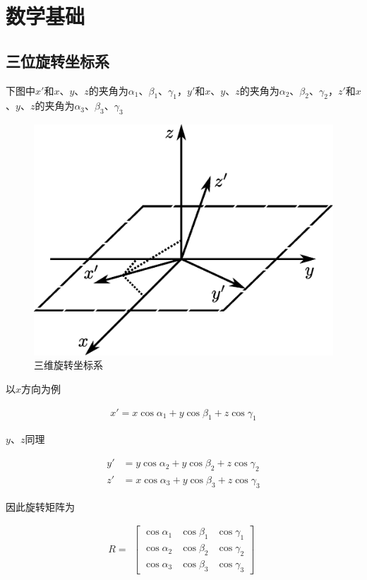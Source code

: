 \section{数学基础}

\subsection{三位旋转坐标系}

下图中$x'$和$x$、$y$、$z$的夹角为$\alpha_1$、$\beta_1$、$\gamma_1$，$y'$和$x$、$y$、$z$的夹角为$\alpha_2$、$\beta_2$、$\gamma_2$，$z'$和$x$、$y$、$z$的夹角为$\alpha_3$、$\beta_3$、$\gamma_3$

\begin{figure}[H]
  \centering
  \includegraphics[width=0.5\linewidth]{figures/三维旋转坐标系}
  \caption{三维旋转坐标系}
  \label{fig:三维旋转坐标系}
\end{figure}

以$x$方向为例

\begin{equation*}
  \begin{aligned}
    x' = x \cos \alpha_1 + y \cos \beta_1 + z \cos \gamma_1
  \end{aligned}
\end{equation*}

$y$、$z$同理

\begin{equation*}
  \begin{aligned}
    y' &= y \cos \alpha_2 + y \cos \beta_2 + z \cos \gamma_2 \\
    z' &= x \cos \alpha_3 + y \cos \beta_3 + z \cos \gamma_3
  \end{aligned}
\end{equation*}

因此旋转矩阵为

\begin{equation*}
  R = 
  \begin{aligned}
    \left[
      \begin{array}{ccc}
       \cos \alpha_{1} & \cos \beta_{1} & \cos \gamma_{1}\\
       \cos \alpha_{2} & \cos \beta_{2} & \cos \gamma_{2}\\
       \cos \alpha_{3} & \cos \beta_{3} & \cos \gamma_{3}
      \end{array}
    \right ]
  \end{aligned}
\end{equation*}

